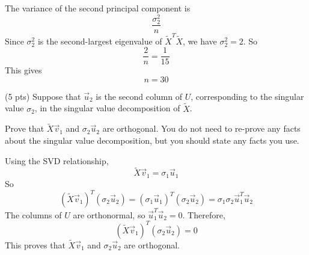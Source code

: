 \documentclass[11pt]{article}
\begin{document}
\begin{prob}[(12 pts)]
\begin{subprob}
\begin{solution}
The variance of the second principal component is
\[
\frac{\sigma_2^2}{n}
\]
Since $\sigma_2^2$ is the second-largest eigenvalue of $\tilde X^T\tilde X$, we have $\sigma_2^2=2$. So
\[
\frac{2}{n}=\frac{1}{15}
\]
This gives
\[
n=\boxed{30}
\]
\end{solution}
\end{subprob}

\begin{subprob}(5 pts)
Suppose that $\vec u_2$ is the second column of $U$, corresponding to the singular value $\sigma_2$, in the singular value decomposition of $\tilde X$.

Prove that $\tilde X \vec v_1$ and $\sigma_2 \vec u_2$ are orthogonal. You do not need to re-prove any facts about the singular value decomposition, but you should state any facts you use. \\

\emptybox{7cm}

\begin{solution}
Using the SVD relationship,
\[
\tilde X\vec v_1 = \sigma_1\vec u_1
\]
So
\[
(\tilde X\vec v_1)^T(\sigma_2\vec u_2)
=
(\sigma_1\vec u_1)^T(\sigma_2\vec u_2)
=
\sigma_1\sigma_2 \vec u_1^T\vec u_2
\]
The columns of $U$ are orthonormal, so $\vec u_1^T\vec u_2=0$. Therefore,
\[
(\tilde X\vec v_1)^T(\sigma_2\vec u_2)=0
\]
This proves that $\tilde X\vec v_1$ and $\sigma_2\vec u_2$ are orthogonal.
\end{solution}

\end{subprob}

\end{prob}


\end{document}
